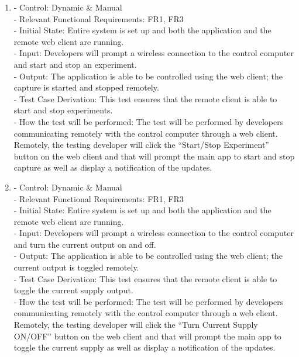 \documentclass[12pt, titlepage]{article}
\begin{document}
\begin{enumerate}[{FR-T}1.]
    \item\label{T7} - Control: Dynamic \& Manual\\ 
    - Relevant Functional Requirements: FR1, FR3\\
    - Initial State: Entire system is set up and both the application and the remote web client are running.\\
    - Input: Developers will prompt a wireless connection to the control computer and start and stop an experiment.\\
    - Output: The application is able to be controlled using the web client; the capture is started and stopped remotely.\\
    - Test Case Derivation: This test ensures that the remote client is able to start and stop experiments.\\
    - How the test will be performed: The test will be performed by developers communicating remotely with the control computer through a web client. Remotely, the testing developer will click the “Start/Stop Experiment” button on the web client and that will prompt the main app to start and stop capture as well as display a notification of the updates.

    \item\label{T8} - Control: Dynamic \& Manual\\ 
    - Relevant Functional Requirements: FR1, FR3\\
    - Initial State: Entire system is set up and both the application and the remote web client are running.\\
    - Input: Developers will prompt a wireless connection to the control computer and turn the current output on and off.\\
    - Output: The application is able to be controlled using the web client; the current output is toggled remotely.\\
    - Test Case Derivation: This test ensures that the remote client is able to toggle the current supply output.\\
    - How the test will be performed: The test will be performed by developers communicating remotely with the control computer through a web client. Remotely, the testing developer will click the “Turn Current Supply ON/OFF” button on the web client and that will prompt the main app to toggle the current supply as well as display a notification of the updates.


\end{enumerate}
\end{document}
